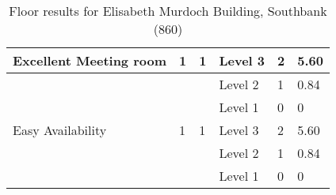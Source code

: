 \begin{table}[H]
{\begin{tabular}{|l|l|l|l|l|l|}
Excellent Meeting room & 1                       & 1                                & Level 3              & 2             & 5.60            \\ \hline
                       &                         &                                  & Level 2              & 1             & 0.84            \\ \hline
                       &                         &                                  & Level 1              & 0             & 0               \\ \hline
Easy Availability      & 1                       & 1                                & Level 3              & 2             & 5.60            \\ \hline
                       &                         &                                  & Level 2              & 1             & 0.84            \\ \hline
                       &                         &                                  & Level 1              & 0             & 0               \\ \hline
\end{tabular}
}
\caption{Floor results for Elisabeth Murdoch Building, Southbank (860)}
\label{appendix:eliz_mr_floor}
\end{table}



\begin{table}[H]
\centering
{}
\caption{Floor results for Werribee Veterinary Hospital, Werribee (411)}
\label{appendix:werribee_mr_floor}
\end{table}
